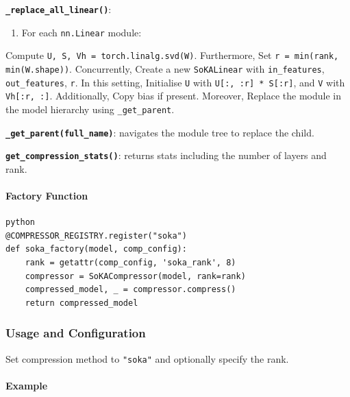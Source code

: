 \textbf{\texttt{\_replace\_all\_linear()}}:

\begin{enumerate}
\item For each \texttt{nn.Linear} module:
\end{enumerate}
Compute \texttt{U, S, Vh = torch.linalg.svd(W)}. Furthermore, Set \texttt{r = min(rank, min(W.shape))}. Concurrently, Create a new \texttt{SoKALinear} with \texttt{in\_features}, \texttt{out\_features}, \texttt{r}. In this setting, Initialise \texttt{U} with \texttt{U[:, :r] * S[:r]}, and \texttt{V} with \texttt{Vh[:r, :]}. Additionally, Copy bias if present. Moreover, Replace the module in the model hierarchy using \texttt{\_get\_parent}.


\textbf{\texttt{\_get\_parent(full\_name)}}: navigates the module tree to replace the child.

\textbf{\texttt{get\_compression\_stats()}}: returns stats including the number of layers and rank.

\paragraph{Factory Function}

\vspace{0.5em}
\begin{mdframed}[backgroundcolor=codebg, linecolor=codeframe, linewidth=1pt, roundcorner=4pt, innerleftmargin=2pt, innerrightmargin=5pt, innertopmargin=5pt, innerbottommargin=5pt]
\begin{lstlisting}
python
@COMPRESSOR_REGISTRY.register("soka")
def soka_factory(model, comp_config):
    rank = getattr(comp_config, 'soka_rank', 8)
    compressor = SoKACompressor(model, rank=rank)
    compressed_model, _ = compressor.compress()
    return compressed_model
\end{lstlisting}
\end{mdframed}
\vspace{0.5em}


\subsubsection*{Usage and Configuration}

Set compression method to \texttt{"soka"} and optionally specify the rank.

\paragraph{Example}


